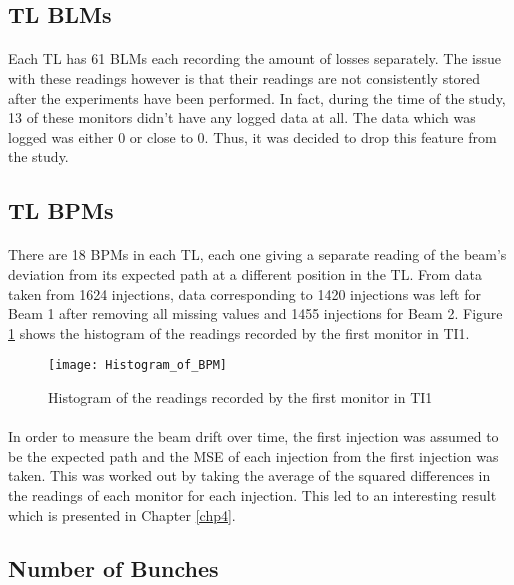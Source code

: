 \subsection{\acs{TL} \acs{BLM}s}
\paragraph{ }Each \acs{TL} has 61 \acs{BLM}s each recording the amount of losses separately. The issue with these readings however is that their readings are not consistently stored after the experiments have been performed. In fact, during the time of the study, 13 of these monitors didn't have any logged data at all. The data which was logged was either 0 or close to 0. Thus, it was decided to drop this feature from the study.   

\subsection{\acs{TL} \acs{BPM}s}
\paragraph{ }There are 18 \acs{BPM}s in each \acs{TL}, each one giving a separate reading of the beam's deviation from its expected path at a different position in the \acs{TL}. From data taken from 1624 injections, data corresponding to 1420 injections was left for Beam 1 after removing all missing values and 1455 injections for Beam 2. Figure \ref{fig::BPM_hist} shows the histogram of the readings recorded by the first monitor in TI1.

\begin{figure}[b]
	\centering
	\texttt{[image: Histogram\_of\_BPM]}
	\caption[BPM Histogram]{Histogram of the readings recorded by the first monitor in TI1}
	\label{fig::BPM_hist}
\end{figure} 

\paragraph{ }In order to measure the beam drift over time, the first injection was assumed to be the expected path and the \acs{MSE} of each injection from the first injection was taken. This was worked out by taking the average of the squared differences in the readings of each monitor for each injection. This led to an interesting result which is presented in Chapter \ref{chp4}.

\subsection{Number of Bunches}

